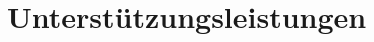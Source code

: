\documentclass[../main.tex]{subfiles}
\begin{document}
	\chapter{Unterstützungsleistungen}
	\thispagestyle{empty}
\end{document}
